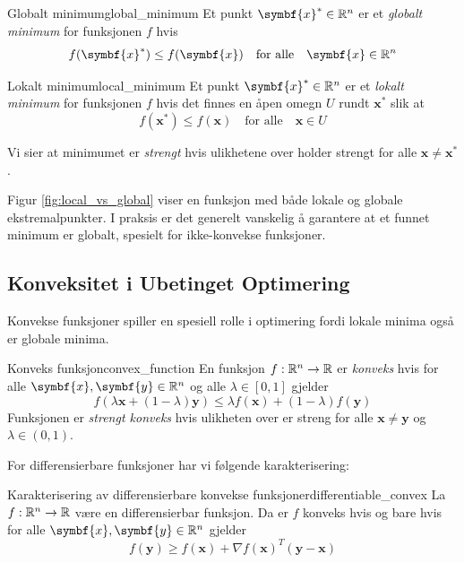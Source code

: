 \begin{definition}{Globalt minimum}{global_minimum}
	Et punkt \(\symbf{x}^\ast \in \R^n\) er et \textit{globalt minimum} for funksjonen \(f\) hvis
	\[
		f(\symbf{x}^\ast) \leq f(\symbf{x}) \quad \text{for alle} \quad \symbf{x} \in \R^n
	\]
\end{definition}

\begin{definition}{Lokalt minimum}{local_minimum}
	Et punkt \(\symbf{x}^\ast \in \R^n\) er et \textit{lokalt minimum} for funksjonen \(f\) hvis det finnes en åpen omegn \(U\) rundt \(\symbf{x}^\ast\) slik at
	\[
		f(\symbf{x}^\ast) \leq f(\symbf{x}) \quad \text{for alle} \quad \symbf{x} \in U
	\]
\end{definition}

Vi sier at minimumet er \textit{strengt} hvis ulikhetene over holder strengt for alle \( \symbf{x} \neq \symbf{x}^\ast \).

Figur \ref{fig:local_vs_global} viser en funksjon med både lokale og globale ekstremalpunkter. I praksis er det generelt vanskelig å garantere at et funnet minimum er globalt, spesielt for ikke-konvekse funksjoner.

\subsection{Konveksitet i Ubetinget Optimering}
Konvekse funksjoner spiller en spesiell rolle i optimering fordi lokale minima også er globale minima.

\begin{definition}{Konveks funksjon}{convex_function}
	En funksjon \(f: \mathbb{R}^n \to \mathbb{R}\) er \textit{konveks} hvis for alle \(\symbf{x}, \symbf{y} \in \R^n\) og alle \(\lambda \in [0,1]\) gjelder
	\[
		f(\lambda \symbf{x} + (1-\lambda)\symbf{y}) \leq \lambda f(\symbf{x}) + (1-\lambda)f(\symbf{y})
	\]
	Funksjonen er \textit{strengt konveks} hvis ulikheten over er streng for alle \(\symbf{x} \neq \symbf{y}\) og \(\lambda \in (0,1)\).
\end{definition}

For differensierbare funksjoner har vi følgende karakterisering:

\begin{proposition}{Karakterisering av differensierbare konvekse funksjoner}{differentiable_convex}
	La \(f: \mathbb{R}^n \to \mathbb{R}\) være en differensierbar funksjon. Da er \(f\) konveks hvis og bare hvis for alle \(\symbf{x}, \symbf{y} \in \R^n\) gjelder
	\[
		f(\symbf{y}) \geq f(\symbf{x}) + \nabla f(\symbf{x})^T (\symbf{y} - \symbf{x})
	\]
\end{proposition}

